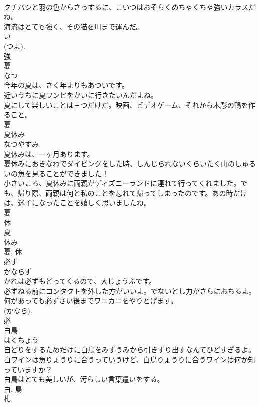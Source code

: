 \documentclass[8pt]{extreport}
\begin{document}
\begin{CJK}{UTF8}{min}
\\	クチバシと羽の色からさっするに、こいつはおそらくめちゃくちゃ強いカラスだね。	
\\	海流はとても強く、その猫を川まで運んだ。	
\\	い 
\\	(つよ). 
\\	強	
\\	夏	
\\	なつ	
\\	今年の夏は、さく年よりもあついです。	
\\	近いうちに夏ワンピをかいに行きたいんだよね。	
\\	夏にして楽しいことは三つだけだ。映画、ビデオゲーム、それから木彫の鴨を作ること。	
\\	夏	
\\	夏休み	
\\	なつやすみ	
\\	夏休みは、一ヶ月あります。	
\\	夏休みにおきなわでダイビングをした時、しんじられないくらいたく山のしゅるいの魚を見ることができました！	
\\	小さいころ、夏休みに両親がディズニーランドに連れて行ってくれました。でも、帰り際、両親は何と私のことを忘れて帰ってしまったのです。あの時だけは、迷子になったことを嬉しく思いましたね。	
\\	夏 
\\	休 
\\	夏 
\\	休み 
\\	夏, 休	
\\	必ず	
\\	かならず	
\\	かれは必ずもどってくるので、大じょうぶです。	
\\	必ずねる前にコンタクトを外した方がいいよ。でないとし力がさらにおちるよ。	
\\	何があっても必ずさい後までワニカニをやりとげます。	
\\	(かなら). 
\\	必	
\\	白鳥	
\\	はくちょう	
\\	自どりをするためだけに白鳥をみずうみから引きずり出すなんてひどすぎるよ。	
\\	白ワインは魚りょうりに合うっていうけど、白鳥りょうりに合うワインは何か知っていますか？	
\\	白鳥はとても美しいが、汚らしい言葉遣いをする。	
\\	白, 鳥	
\\	札	

\end{CJK}
\end{document}
